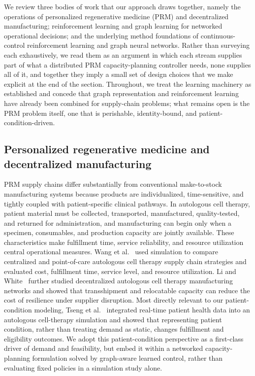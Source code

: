 \documentclass[preprint,review,12pt]{elsarticle}
\begin{document}
We review three bodies of work that our approach draws together, namely the operations of personalized regenerative medicine (PRM) and decentralized manufacturing; reinforcement learning and graph learning for networked operational decisions; and the underlying method foundations of continuous-control reinforcement learning and graph neural networks. Rather than surveying each exhaustively, we read them as an argument in which each stream supplies part of what a distributed PRM capacity-planning controller needs, none supplies all of it, and together they imply a small set of design choices that we make explicit at the end of the section. Throughout, we treat the learning machinery as established and concede that graph representation and reinforcement learning have already been combined for supply-chain problems; what remains open is the PRM problem itself, one that is perishable, identity-bound, and patient-condition-driven.

\subsection{Personalized regenerative medicine and decentralized manufacturing}
PRM supply chains differ substantially from conventional make-to-stock manufacturing systems because products are individualized, time-sensitive, and tightly coupled with patient-specific clinical pathways. In autologous cell therapy, patient material must be collected, transported, manufactured, quality-tested, and returned for administration, and manufacturing can begin only when a specimen, consumables, and production capacity are jointly available. These characteristics make fulfillment time, service reliability, and resource utilization central operational measures. Wang et al.~\cite{Wang2023SimulationBased} used simulation to compare centralized and point-of-care autologous cell therapy supply chain strategies and evaluated cost, fulfillment time, service level, and resource utilization. Li and White~\cite{Li2023} further studied decentralized autologous cell therapy manufacturing networks and showed that transshipment and relocatable capacity can reduce the cost of resilience under supplier disruption. Most directly relevant to our patient-condition modeling, Tseng et al.~\cite{Tseng2024PatientHealth} integrated real-time patient health data into an autologous cell-therapy simulation and showed that representing patient condition, rather than treating demand as static, changes fulfillment and eligibility outcomes. We adopt this patient-condition perspective as a first-class driver of demand and feasibility, but embed it within a networked capacity-planning formulation solved by graph-aware learned control, rather than evaluating fixed policies in a simulation study alone.
\end{document}
